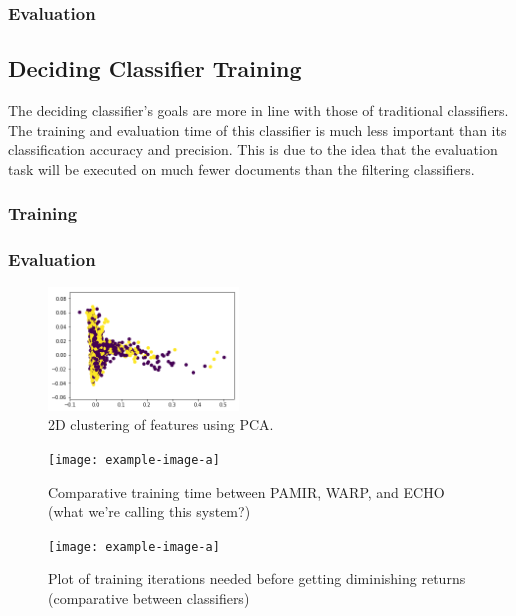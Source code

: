 \subsubsection{Evaluation}

\subsection{Deciding Classifier Training}
The deciding classifier's goals are more in line with those of traditional classifiers. The training and evaluation time of this classifier is much less important than its classification accuracy and precision. This is due to the idea that the evaluation task will be executed on much fewer documents than the filtering classifiers.

\subsubsection{Training}

\subsubsection{Evaluation}

\begin{figure}[h]
    \centering
    \includegraphics[width=0.45\textwidth]{figures/pca-cluster-hl.png}
    \caption{2D clustering of features using PCA.}
    \label{fig:pcahl}
\end{figure}


\begin{figure}
    \centering
    \texttt{[image: example-image-a]}
    \caption{Comparative training time between PAMIR, WARP, and ECHO (what we're calling this system?)}
    \label{fig:my-label}
\end{figure}

\begin{figure}
    \centering
    \texttt{[image: example-image-a]}
    \caption{Plot of training iterations needed before getting diminishing returns (comparative between classifiers)}
    \label{fig:learning-curve}
\end{figure}

